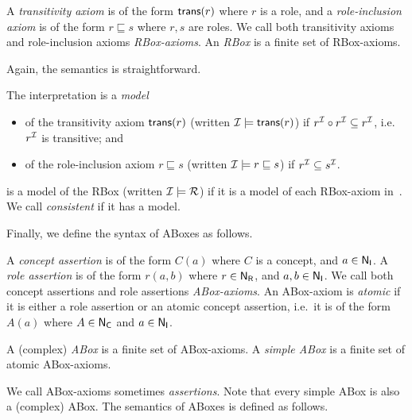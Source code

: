 \begin{definition}
    A \emph{transitivity axiom} is of the form $\mathsf{trans}(r)$ where $r$ is a
    role, and a \emph{role-inclusion axiom} is of the form
    $r\sqsubseteq s$ where $r,s$ are roles.
    We call both transitivity axioms and role-inclusion axioms
    \emph{RBox-axioms}.
    An \emph{RBox} is a finite set of RBox-axioms.
\end{definition}

\noindent
Again, the semantics is straightforward.

\begin{definition}
    The interpretation \Imc is a \emph{model}
    \begin{itemize}
        \item of the transitivity axiom $\mathsf{trans}(r)$ (written
            $\mathcal{I}\models\mathsf{trans}(r)$) if $r^\mathcal{I}\circ r^\mathcal{I}\subseteq r^\mathcal{I}$,
            i.e.\ $r^\mathcal{I}$ is transitive; and
        \item of the role-inclusion axiom $r\sqsubseteq s$ (written $\mathcal{I}\models
            r\sqsubseteq s$) if $r^\mathcal{I}\subseteq s^\mathcal{I}$.
    \end{itemize}
    \Imc is a model of the RBox \Rmc (written $\mathcal{I}\models\mathcal{R}$) if it is
    a model of each RBox-axiom in~\Rmc.
    We call \Rmc \emph{consistent} if it has a model.
\end{definition}

\noindent
Finally, we define the syntax of ABoxes as follows.

\begin{definition}\label{def:syntax-abox}
    A \emph{concept assertion} is of the form $C(a)$ where $C$ is a concept, and
    $a\in\mathsf{N_I}$.  A \emph{role assertion} is of the form $r(a,b)$ where $r\in\mathsf{N_R}$,
    and $a,b\in\mathsf{N_I}$.  We call both concept assertions and role assertions
    \emph{ABox-axioms}.
    An ABox-axiom is \emph{atomic} if it is either a role assertion or an atomic
    concept assertion, i.e.\ it is of the form $A(a)$ where $A\in\mathsf{N_C}$ and
    $a\in\mathsf{N_I}$.

    A (complex) \emph{ABox} is a finite set of ABox-axioms.
    A \emph{simple ABox} is a finite set of atomic ABox-axioms.
\end{definition}

\noindent
We call ABox-axioms sometimes \emph{assertions}.  Note that every simple ABox is
also a (complex) ABox.
%
The semantics of ABoxes is defined as follows.

